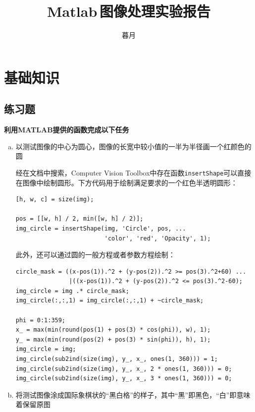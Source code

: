 \documentclass[10pt, a4paper]{article}
\begin{document}

\title{Matlab\,图像处理实验报告}
\author{暮月}

\maketitle

\tableofcontents

\section{基础知识}
\subsection{练习题}
\textbf{利用MATLAB提供的函数完成以下任务}
\begin{enumerate}[(a)]
    \item 以测试图像的中心为圆心，图像的长宽中较小值的一半为半径画一个红颜色的圆

          经在文档中搜索，Computer Vision Toolbox中存在函数\texttt{insertShape}可以直接在图像中绘制圆形。下方代码用于绘制满足要求的一个红色半透明圆形：

          \begin{verbatim}
[h, w, c] = size(img);

pos = [[w, h] / 2, min([w, h] / 2)];
img_circle = insertShape(img, 'Circle', pos, ...
                         'color', 'red', 'Opacity', 1);
          \end{verbatim}

          此外，还可以通过圆的一般方程或者参数方程绘制：

          \begin{verbatim}
circle_mask = ((x-pos(1)).^2 + (y-pos(2)).^2 >= pos(3).^2+60) ...
               |((x-pos(1)).^2 + (y-pos(2)).^2 <= pos(3).^2-60);
img_circle = img .* circle_mask;
img_circle(:,:,1) = img_circle(:,:,1) + ~circle_mask;

phi = 0:1:359;
x_ = max(min(round(pos(1) + pos(3) * cos(phi)), w), 1);
y_ = max(min(round(pos(2) + pos(3) * sin(phi)), h), 1);
img_circle = img;
img_circle(sub2ind(size(img), y_, x_, ones(1, 360))) = 1;
img_circle(sub2ind(size(img), y_, x_, 2 * ones(1, 360))) = 0;
img_circle(sub2ind(size(img), y_, x_, 3 * ones(1, 360))) = 0;
          \end{verbatim}

    \item 将测试图像涂成国际象棋状的“黑白格”的样子，其中“黑”即黑色，“白”即意味着保留原图


\end{enumerate}
\end{document}
